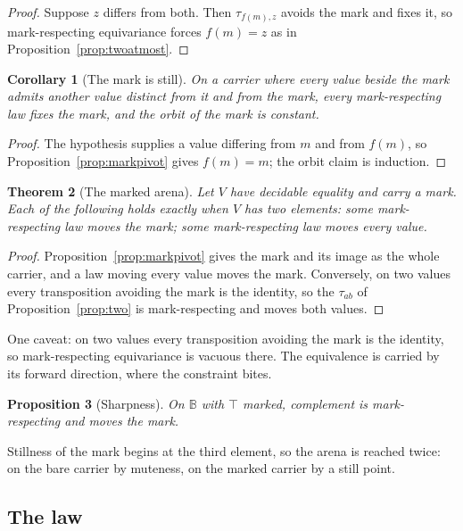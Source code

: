 \documentclass[11pt]{article}
\newtheorem{theorem}{Theorem}[section]
\newtheorem{proposition}[theorem]{Proposition}
\newtheorem{corollary}[theorem]{Corollary}
\newcommand{\B}{\mathbb{B}}
\begin{document}
\begin{proof}
Suppose $z$ differs from both. Then $\tau_{f(m),z}$ avoids the mark and fixes it, so mark-respecting equivariance forces $f(m) = z$ as in Proposition~\ref{prop:twoatmost}.
\end{proof}

\begin{corollary}[The mark is still]
\label{cor:markstill}
On a carrier where every value beside the mark admits another value distinct from it and from the mark, every mark-respecting law fixes the mark, and the orbit of the mark is constant.
\end{corollary}

\begin{proof}
The hypothesis supplies a value differing from $m$ and from $f(m)$, so Proposition~\ref{prop:markpivot} gives $f(m) = m$; the orbit claim is induction.
\end{proof}

\begin{theorem}[The marked arena]
\label{thm:markedarena}
Let $V$ have decidable equality and carry a mark. Each of the following holds exactly when $V$ has two elements: some mark-respecting law moves the mark; some mark-respecting law moves every value.
\end{theorem}

\begin{proof}
Proposition~\ref{prop:markpivot} gives the mark and its image as the whole carrier, and a law moving every value moves the mark. Conversely, on two values every transposition avoiding the mark is the identity, so the $\tau_{ab}$ of Proposition~\ref{prop:two} is mark-respecting and moves both values.
\end{proof}

One caveat: on two values every transposition avoiding the mark is the identity, so mark-respecting equivariance is vacuous there. The equivalence is carried by its forward direction, where the constraint bites.

\begin{proposition}[Sharpness]
\label{prop:marksharp}
On $\B$ with $\top$ marked, complement is mark-respecting and moves the mark.
\end{proposition}

Stillness of the mark begins at the third element, so the arena is reached twice: on the bare carrier by muteness, on the marked carrier by a still point.

\subsection{The law}
\end{document}
